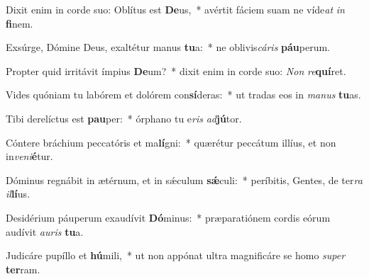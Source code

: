 \item Dixit enim in corde suo: Oblítus est \textbf{De}us,~* avértit fáciem suam ne víde\textit{at} \textit{in} \textbf{fi}nem.
\item Exsúrge, Dómine Deus, exaltétur manus \textbf{tu}a:~* ne oblivis\textit{cá}\textit{ris} \textbf{páu}perum.
\item Propter quid irritávit ímpius \textbf{De}um?~* dixit enim in corde suo: \textit{Non} \textit{re}\textbf{quí}ret.
\item Vides quóniam tu labórem et dolórem con\textbf{sí}deras:~* ut tradas eos in \textit{ma}\textit{nus} \textbf{tu}as.
\item Tibi derelíctus est \textbf{pau}per:~* órphano tu e\textit{ris} \textit{ad}\textbf{jú}tor.
\item Cóntere bráchium peccatóris et ma\textbf{lí}gni:~* quærétur peccátum illíus, et non in\textit{ve}\textit{ni}\textbf{é}tur.
\item Dóminus regnábit in ætérnum, et in sǽculum \textbf{sǽ}culi:~* períbitis, Gentes, de ter\textit{ra} \textit{il}\textbf{lí}us.
\item Desidérium páuperum exaudívit \textbf{Dó}minus:~* præparatiónem cordis eórum audívit \textit{au}\textit{ris} \textbf{tu}a.
\item Judicáre pupíllo et \textbf{hú}mili,~* ut non appónat ultra magnificáre se homo \textit{su}\textit{per} \textbf{ter}ram.
